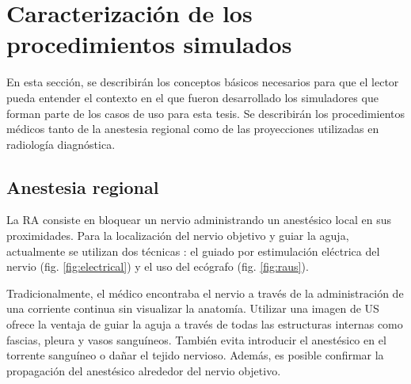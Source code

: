 \section{Caracterización de los procedimientos simulados}

En esta sección, se describirán los conceptos básicos necesarios para que el lector pueda entender el contexto en el que fueron desarrollado los simuladores que forman parte de los casos de uso para esta tesis. Se describirán los procedimientos médicos tanto de la anestesia regional como de las proyecciones utilizadas en radiología diagnóstica.

\subsection{Anestesia regional}
\label{art:ra}


La \ac{RA} consiste en bloquear un nervio administrando un anestésico local en sus proximidades. Para la localización del nervio objetivo y guiar la aguja, actualmente se utilizan dos técnicas \cite{ded2.1}: el guiado por estimulación eléctrica del nervio (fig. \ref{fig:electrical}) y el uso del ecógrafo (fig. \ref{fig:raus}).

Tradicionalmente, el médico encontraba el nervio a través de la administración de una corriente continua sin visualizar la anatomía. Utilizar una imagen de \ac{US} ofrece la ventaja de guiar la aguja a través de todas las estructuras internas como fascias, pleura y vasos sanguíneos. También evita introducir el anestésico en el torrente sanguíneo o dañar el tejido nervioso. Además, es posible confirmar la propagación del anestésico alrededor del nervio objetivo.  

